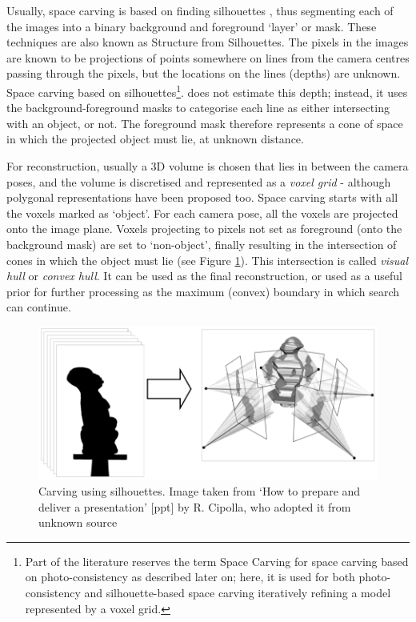 Usually, space carving is based on finding silhouettes \cite{Hartley2003, Matusik2000}, thus segmenting each of the images into a binary background and foreground `layer' or mask. These techniques are also known as Structure from Silhouettes. The pixels in the images are known to be projections of points somewhere on lines from the camera centres passing through the pixels, but the locations on the lines (\ie depths) are unknown. Space carving based on silhouettes\footnote{Part of the literature reserves the term Space Carving for space carving based on photo-consistency as described later on; here, it is used for both photo-consistency and silhouette-based space carving iteratively refining a model represented by a voxel grid.}. does not estimate this depth; instead, it uses the background-foreground masks to categorise each line as either intersecting with an object, or not. The foreground mask therefore represents a cone of space in which the projected object must lie, at unknown distance. 

For reconstruction, usually a 3D volume is chosen that lies in between the camera poses, and the volume is discretised and represented as a \emph{voxel grid} - although polygonal representations have been proposed too. Space carving starts with all the voxels marked as `object'. For each camera pose, all the voxels are projected onto the image plane. Voxels projecting to pixels not set as foreground (\ie onto the background mask) are set to `non-object', finally resulting in the intersection of cones in which the object must lie (see Figure \ref{fig:carving}). This intersection is called \emph{visual hull} or \emph{convex hull}. It can be used as the final reconstruction, or used as a useful prior for further processing as the maximum (convex) boundary in which search can continue.

\begin{figure}[htb!]
 \centering
 \includegraphics[width=1.0\textwidth]{img/carving}
 \caption{Carving using silhouettes. Image taken from `How to prepare and deliver a presentation' [ppt] by R. Cipolla, who adopted it from unknown source}
 \label{fig:carving}
\end{figure}

